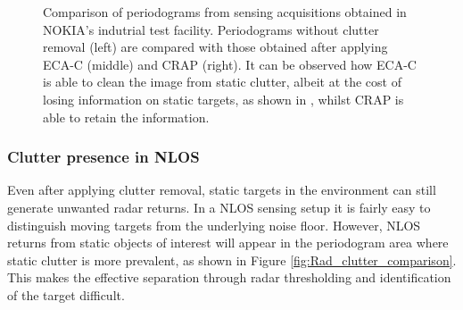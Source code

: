 \begin{figure}[H]
{		}\hfill
		\caption[]{\small Comparison of periodograms from sensing acquisitions obtained in NOKIA's indutrial test facility.
		Periodograms without clutter removal (left) are compared with those obtained after applying ECA-C (middle) and CRAP (right). It can be observed how ECA-C is able to clean the image from static clutter, albeit at the cost of losing information on static targets, as shown in , whilst CRAP is able to retain the information.  }
		\label{fig:Rad_clutter_crap-ecac}
	\end{figure}
	
	\subsubsection{Clutter presence in NLOS}
	
	Even after applying clutter removal, static targets in the environment can still generate unwanted radar returns.
	In a NLOS sensing setup it is fairly easy to distinguish moving targets from the underlying noise floor.
	However, NLOS returns from static objects of interest will appear in the periodogram area where static clutter is more prevalent, as shown in Figure \ref{fig:Rad_clutter_comparison}.
	This makes the effective separation through radar thresholding and identification of the target difficult.

